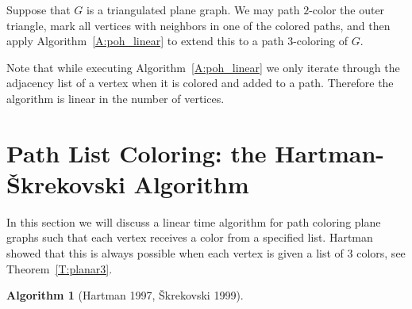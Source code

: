 \documentclass[12pt,letterpaper]{article}
\theoremstyle{plain}
\theoremstyle{definition}
\theoremstyle{break}
\newtheorem{algorithm}[lemma]{Algorithm}     %
\begin{document}
Suppose that $G$ is a triangulated plane graph. We may path $2$-color the outer
triangle, mark all vertices with neighbors in one of the colored paths, and
then apply Algorithm~\ref{A:poh_linear} to extend this to a path
$3$-coloring of $G$.

Note that while executing Algorithm~\ref{A:poh_linear} we only iterate through
the adjacency list of a vertex when it is colored and added
to a path. Therefore the algorithm is linear in the number of vertices.

\section{Path List Coloring: the Hartman-\v{S}krekovski Algorithm}

In this section we will discuss a linear time algorithm for path coloring
plane graphs such that each vertex receives a color from a specified list.
Hartman showed that this is always possible when each vertex is given a
list of $3$ colors, see Theorem~\ref{T:planar3}.

\begin{algorithm}[Hartman 1997, \v{S}krekovski 1999]\label{A:hartman3}

\end{algorithm}
\end{document}
